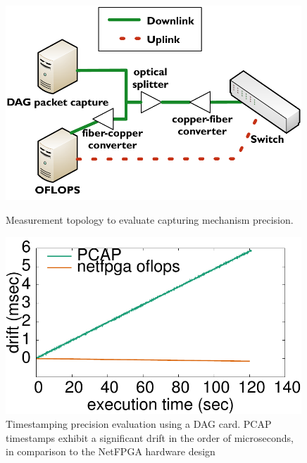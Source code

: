 \begin{figure}
\centering
  \begin{minipage}[b]{0.45\textwidth}
\centering
 \includegraphics[width=0.99\textwidth]{Chapter1/Chapter1Figs/accuracy-topology} 
 \caption[\oflops precision evaluation topology]{Measurement topology to evaluate capturing mechanism precision.}
\label{fig:timestamping_topology}
\end{minipage}
\hspace{0.5cm}
  \begin{minipage}[b]{0.45\textwidth}
\centering
 \includegraphics[width=0.99\textwidth]{Chapter1/Chapter1Figs/timer-precision} 
 \caption[Precision evaluation of PCAP and NetFPGA timestamps]{Timestamping
   precision evaluation using a DAG card. PCAP timestamps
   exhibit a significant drift in the order of microseconds, in comparison to
   the NetFPGA hardware design}
\label{fig:timestamping}
\end{minipage}
\end{figure}

